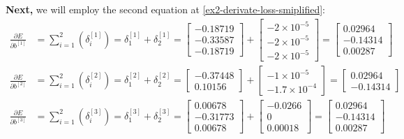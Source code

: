 \documentclass[12pt]{article}
\begin{document}
\begin{enumerate}[leftmargin=\labelsep]
        \textbf{Next,} we will employ the second equation at \eqref{ex2-derivate-loss-smiplified}:
        \begingroup
        \allowdisplaybreaks
          \begin{align*}
            \frac{\partial E}{\partial b^{[1]}} &= \sum_{i=1}^{2} \left(\delta^{[1]}_i\right)
             = \delta^{[1]}_1 + \delta^{[1]}_2
             = \begin{bmatrix} -0.18719 \\ -0.33587 \\ -0.18719 \end{bmatrix} +
                 \begin{bmatrix} -2 \times 10^{-5} \\ -2 \times 10^{-5} \\ -2 \times 10^{-5} \end{bmatrix}
             = \begin{bmatrix} 0.02964 \\ -0.14314 \\ 0.00287 \end{bmatrix} \\
            \frac{\partial E}{\partial b^{[2]}} &= \sum_{i=1}^{2} \left(\delta^{[2]}_i\right)
             = \delta^{[2]}_1 + \delta^{[2]}_2
             = \begin{bmatrix} -0.37448 \\ 0.10156 \end{bmatrix} +
                 \begin{bmatrix} -1 \times 10^{-5} \\ -1.7 \times 10^{-4}  \end{bmatrix}
             = \begin{bmatrix} 0.02964 \\ -0.14314 \end{bmatrix} \\
            \frac{\partial E}{\partial b^{[3]}} &= \sum_{i=1}^{2} \left(\delta^{[3]}_i\right)
             = \delta^{[3]}_1 + \delta^{[3]}_2
             = \begin{bmatrix} 0.00678 \\ -0.31773 \\ 0.00678 \end{bmatrix} +
                 \begin{bmatrix} -0.0266 \\ 0 \\ 0.00018 \end{bmatrix}
             = \begin{bmatrix} 0.02964 \\ -0.14314 \\ 0.00287 \end{bmatrix}
          \end{align*}
        \endgroup


\end{enumerate}
\end{document}
